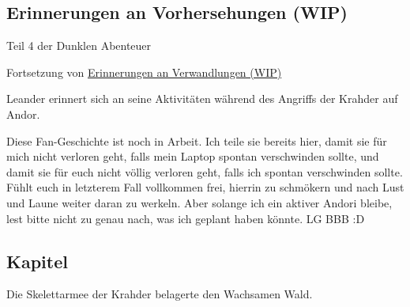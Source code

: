 \begin{chapterbox}
    \chapter{Erinnerungen an Vorhersehungen (WIP)}
    \label{wip-erinnerungen-an-vorhersehungen}
    
    \begin{center}
        Teil 4 der Dunklen Abenteuer

        Fortsetzung von \hyperref[wip-erinnerungen-an-verwandlungen]{Erinnerungen an Verwandlungen (WIP)}
    \end{center}

    Leander erinnert sich an seine Aktivitäten während des Angriffs der Krahder auf Andor.
\end{chapterbox}



Diese Fan-Geschichte ist noch in Arbeit. Ich teile sie bereits hier, damit sie für mich nicht verloren geht, falls mein Laptop spontan verschwinden sollte, und damit sie für euch nicht völlig verloren geht, falls ich spontan verschwinden sollte. Fühlt euch in letzterem Fall vollkommen frei, hierrin zu schmökern und nach Lust und Laune weiter daran zu werkeln. Aber solange ich ein aktiver Andori bleibe, lest bitte nicht zu genau nach, was ich geplant haben könnte. LG BBB :D



\newpage
\section{Kapitel}

Die Skelettarmee der Krahder belagerte den Wachsamen Wald.